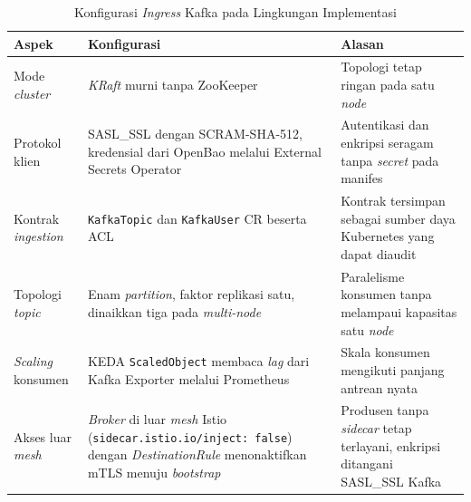 \begin{table}[!htb]
\centering
\caption{Konfigurasi \textit{Ingress} Kafka pada Lingkungan Implementasi}
\label{tab:impl-kafka-config}
\footnotesize
\setlength{\tabcolsep}{3pt}
\begin{tabular}{|>{\raggedright\arraybackslash}m{2.6cm}|>{\raggedright\arraybackslash}m{5.3cm}|>{\raggedright\arraybackslash}m{5.4cm}|}
\hline
\centering\arraybackslash\textbf{Aspek} & \centering\arraybackslash\textbf{Konfigurasi} & \centering\arraybackslash\textbf{Alasan} \\
\hline
Mode \textit{cluster} & \textit{KRaft} murni tanpa ZooKeeper & Topologi tetap ringan pada satu \textit{node} \\
\hline
Protokol klien & SASL\_SSL dengan SCRAM-SHA-512, kredensial dari OpenBao melalui External Secrets Operator & Autentikasi dan enkripsi seragam tanpa \textit{secret} pada manifes \\
\hline
Kontrak \textit{ingestion} & \texttt{KafkaTopic} dan \texttt{KafkaUser} CR beserta ACL & Kontrak tersimpan sebagai sumber daya Kubernetes yang dapat diaudit \\
\hline
Topologi \textit{topic} & Enam \textit{partition}, faktor replikasi satu, dinaikkan tiga pada \textit{multi-node} & Paralelisme konsumen tanpa melampaui kapasitas satu \textit{node} \\
\hline
\textit{Scaling} konsumen & KEDA \texttt{ScaledObject} membaca \textit{lag} dari Kafka Exporter melalui Prometheus & Skala konsumen mengikuti panjang antrean nyata \\
\hline
Akses luar \textit{mesh} & \textit{Broker} di luar \textit{mesh} Istio (\texttt{sidecar.istio.io/inject: false}) dengan \textit{DestinationRule} menonaktifkan mTLS menuju \textit{bootstrap} & Produsen tanpa \textit{sidecar} tetap terlayani, enkripsi ditangani SASL\_SSL Kafka \\
\hline
\end{tabular}
\end{table}
